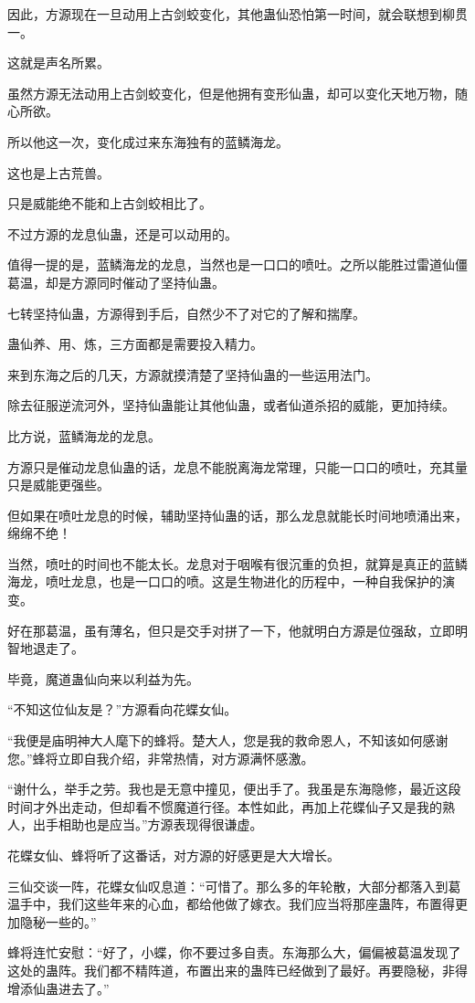 \begin{this_body}
因此，方源现在一旦动用上古剑蛟变化，其他蛊仙恐怕第一时间，就会联想到柳贯一。

这就是声名所累。

虽然方源无法动用上古剑蛟变化，但是他拥有变形仙蛊，却可以变化天地万物，随心所欲。

所以他这一次，变化成过来东海独有的蓝鳞海龙。

这也是上古荒兽。

只是威能绝不能和上古剑蛟相比了。

不过方源的龙息仙蛊，还是可以动用的。

值得一提的是，蓝鳞海龙的龙息，当然也是一口口的喷吐。之所以能胜过雷道仙僵葛温，却是方源同时催动了坚持仙蛊。

七转坚持仙蛊，方源得到手后，自然少不了对它的了解和揣摩。

蛊仙养、用、炼，三方面都是需要投入精力。

来到东海之后的几天，方源就摸清楚了坚持仙蛊的一些运用法门。

除去征服逆流河外，坚持仙蛊能让其他仙蛊，或者仙道杀招的威能，更加持续。

比方说，蓝鳞海龙的龙息。

方源只是催动龙息仙蛊的话，龙息不能脱离海龙常理，只能一口口的喷吐，充其量只是威能更强些。

但如果在喷吐龙息的时候，辅助坚持仙蛊的话，那么龙息就能长时间地喷涌出来，绵绵不绝！

当然，喷吐的时间也不能太长。龙息对于咽喉有很沉重的负担，就算是真正的蓝鳞海龙，喷吐龙息，也是一口口的喷。这是生物进化的历程中，一种自我保护的演变。

好在那葛温，虽有薄名，但只是交手对拼了一下，他就明白方源是位强敌，立即明智地退走了。

毕竟，魔道蛊仙向来以利益为先。

“不知这位仙友是？”方源看向花蝶女仙。

“我便是庙明神大人麾下的蜂将。楚大人，您是我的救命恩人，不知该如何感谢您。”蜂将立即自我介绍，非常热情，对方源满怀感激。

“谢什么，举手之劳。我也是无意中撞见，便出手了。我虽是东海隐修，最近这段时间才外出走动，但却看不惯魔道行径。本性如此，再加上花蝶仙子又是我的熟人，出手相助也是应当。”方源表现得很谦虚。

花蝶女仙、蜂将听了这番话，对方源的好感更是大大增长。

三仙交谈一阵，花蝶女仙叹息道：“可惜了。那么多的年轮散，大部分都落入到葛温手中，我们这些年来的心血，都给他做了嫁衣。我们应当将那座蛊阵，布置得更加隐秘一些的。”

蜂将连忙安慰：“好了，小蝶，你不要过多自责。东海那么大，偏偏被葛温发现了这处的蛊阵。我们都不精阵道，布置出来的蛊阵已经做到了最好。再要隐秘，非得增添仙蛊进去了。”


\end{this_body}
